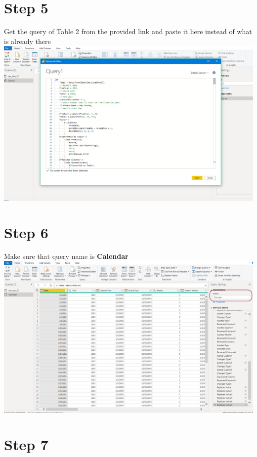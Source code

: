 \documentclass[
]{book}
\begin{document}
\hypertarget{step-5}{%
\section{Step 5}\label{step-5}}

Get the query of Table 2 from the provided link and paste it here instead of
what is already there
\includegraphics{assets/query_2.png}

\hypertarget{step-6}{%
\section{Step 6}\label{step-6}}

Make sure that query name is \textbf{Calendar}
\includegraphics{assets/query_2b.png}

\hypertarget{step-7}{%
\section{Step 7}\label{step-7}}
\end{document}
